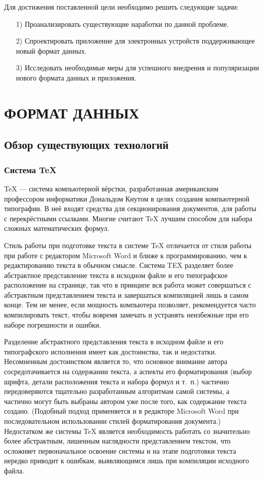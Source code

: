 Для достижения поставленной цели необходимо решить следующие задачи:
\begin{enumerate}
 \item[1)] Проанализировать существующие наработки по данной проблеме.
 \item[2)] Спроектировать приложение для электронных устройств поддерживающее новый формат данных.
 \item[3)] Исследовать необходимые меры для успешного внедрения и популяризации нового формата данных и приложения.
\end{enumerate}


\newpage
\chapter{ФОРМАТ ДАННЫХ}

\section{Обзор существующих технологий}
\subsection{Система \TeX{}}
\TeX{} --– система компьютерной вёрстки, разработанная американским профессором информатики Дональдом Кнутом в целях создания компьютерной типографии. В неё входят средства для секционирования документов, для работы с перекрёстными ссылками. Многие считают \TeX{} лучшим способом для набора сложных математических формул\cite{Kotelnikov}.

Стиль работы при подготовке текста в системе \TeX{} отличается от стиля работы при работе с редактором Microsoft Word и ближе к программированию, чем к редактированию текста в обычном смысле. Система TEX разделяет более абстрактное представление текста в исходном файле и его типографское расположение на странице, так что в принципе вся работа может совершаться с абстрактным представлением текста и завершаться компиляцией лишь в самом конце. Тем не менее, если мощность компьютера позволяет, рекомендуется часто компилировать текст, чтобы вовремя замечать и устранять неизбежные при его наборе погрешности и ошибки.

Разделение абстрактного представления текста в исходном файле и его типографского исполнения имеет как достоинства, так и недостатки. Несомненным достоинством является то, что основное внимание автора сосредотачивается на содержании текста, а аспекты его форматирования (выбор шрифта, детали расположения текста и набора формул и т.~п.) частично передоверяются тщательно разработанным алгоритмам самой системы, а частично могут быть выбраны автором уже после того, как содержание текста создано. (Подобный подход применяется и в редакторе Microsoft Word при последовательном использовании стилей форматирования документа.) Недостатком же системы \TeX{} является необходимость работать со значительно более абстрактным, лишенным наглядности представлением текстом, что осложняет первоначальное освоение системы и на этапе подготовки текста нередко приводит к ошибкам, выявляющимся лишь при компиляции исходного файла.

